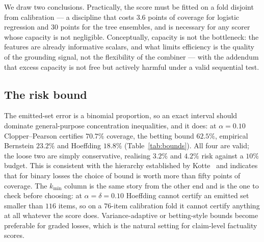 \documentclass[review,number,doubleblind]{elsarticle}
\theoremstyle{plain}
\theoremstyle{definition}
\theoremstyle{remark}
\begin{document}
We draw two conclusions. Practically, the score must be fitted on a fold disjoint from
calibration --- a discipline that costs $3.6$ points of coverage for logistic regression and
$30$ points for the tree ensembles, and is necessary for any scorer whose capacity is not
negligible. Conceptually, capacity is not the bottleneck: the features are already informative
scalars, and what limits efficiency is the quality of the grounding signal, not the flexibility
of the combiner --- with the addendum that excess capacity is not free but actively harmful under
a valid sequential test.

\subsection{The risk bound}

The emitted-set error is a binomial proportion, so an exact interval should dominate
general-purpose concentration inequalities, and it does: at $\alpha=0.10$ Clopper--Pearson
certifies $70.7\%$ coverage, the betting bound $62.5\%$, empirical Bernstein $23.2\%$ and
Hoeffding $18.8\%$ (Table~\ref{tab:bounds}). All four are valid; the loose two are simply
conservative, realising $3.2\%$ and $4.2\%$ risk against a $10\%$ budget. This is consistent with
the hierarchy established by Kotte~\cite{crcimposs} and indicates that for binary losses the choice of
bound is worth more than fifty points of coverage. The $k_{\min}$ column is the same story from
the other end and is the one to check before choosing: at $\alpha=\delta=0.10$ Hoeffding cannot
certify an emitted set smaller than $116$ items, so on a $76$-item calibration fold it cannot
certify anything at all whatever the score does. Variance-adaptive or betting-style bounds
\citep{waudbysmith2024} become preferable for graded losses, which is the natural setting for
claim-level factuality scores.
\end{document}
